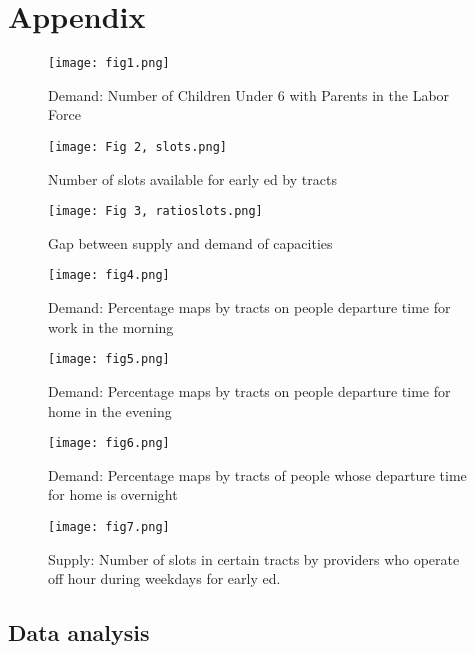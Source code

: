 \documentclass[man]{apa6}
\begin{document}
\section{Appendix}\label{appendix}

\begin{figure}
\centering
\texttt{[image: fig1.png]}
\caption{Demand: Number of Children Under 6 with Parents in the Labor
Force}
\end{figure}

\begin{figure}
\centering
\texttt{[image: Fig 2, slots.png]}
\caption{Number of slots available for early ed by tracts}
\end{figure}

\begin{figure}
\centering
\texttt{[image: Fig 3, ratioslots.png]}
\caption{Gap between supply and demand of capacities}
\end{figure}

\begin{figure}
\centering
\texttt{[image: fig4.png]}
\caption{Demand: Percentage maps by tracts on people departure time for
work in the morning}
\end{figure}

\begin{figure}
\centering
\texttt{[image: fig5.png]}
\caption{Demand: Percentage maps by tracts on people departure time for
home in the evening}
\end{figure}

\begin{figure}
\centering
\texttt{[image: fig6.png]}
\caption{Demand: Percentage maps by tracts of people whose departure
time for home is overnight}
\end{figure}

\begin{figure}
\centering
\texttt{[image: fig7.png]}
\caption{Supply: Number of slots in certain tracts by providers who
operate off hour during weekdays for early ed.}
\end{figure}

\subsection{Data analysis}\label{data-analysis}
\end{document}
